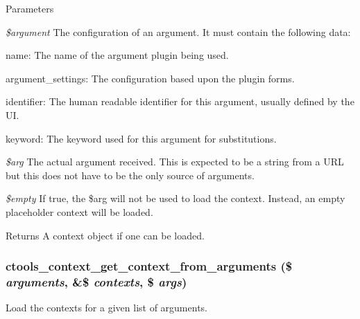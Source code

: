 \begin{DoxyParams}{Parameters}
\item[{\em \$argument}]The configuration of an argument. It must contain the following data:
\begin{DoxyItemize}
\item name: The name of the argument plugin being used.
\item argument\_\-settings: The configuration based upon the plugin forms.
\item identifier: The human readable identifier for this argument, usually defined by the UI.
\item keyword: The keyword used for this argument for substitutions.
\end{DoxyItemize}\item[{\em \$arg}]The actual argument received. This is expected to be a string from a URL but this does not have to be the only source of arguments. \item[{\em \$empty}]If true, the \$arg will not be used to load the context. Instead, an empty placeholder context will be loaded.\end{DoxyParams}
\begin{DoxyReturn}{Returns}
A context object if one can be loaded. 
\end{DoxyReturn}
\hypertarget{context_8inc_aebcef7cae5df2ee7b36493cce24cfd8b}{
\subsubsection[{ctools\_\-context\_\-get\_\-context\_\-from\_\-arguments}]{\setlength{\rightskip}{0pt plus 5cm}ctools\_\-context\_\-get\_\-context\_\-from\_\-arguments (\$ {\em arguments}, \/  \&\$ {\em contexts}, \/  \$ {\em args})}}
\label{context_8inc_aebcef7cae5df2ee7b36493cce24cfd8b}
Load the contexts for a given list of arguments.


